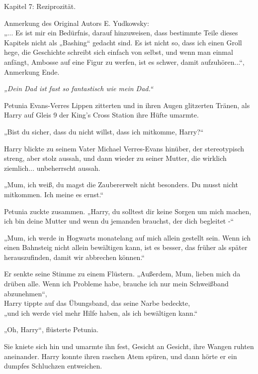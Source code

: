 

\hypertarget{reziprozituxe4t}{%

Kapitel 7: Reziprozität.

Anmerkung des Original Autors E. Yudkowsky:\\ „... Es ist mir ein Bedürfnis, darauf hinzuweisen, dass bestimmte Teile dieses Kapitels nicht als „Bashing“ gedacht sind. Es ist nicht so, dass ich einen Groll hege, die Geschichte schreibt sich einfach von selbst, und wenn man einmal anfängt, Ambosse auf eine Figur zu werfen, ist es schwer, damit aufzuhören...“, Anmerkung Ende.

\emph{„Dein Dad ist fast so fantastisch wie mein Dad.“}

Petunia Evans-Verres Lippen zitterten und in ihren Augen glitzerten Tränen, als Harry auf Gleis 9 der King's Cross Station ihre Hüfte umarmte.

„Bist du sicher, dass du nicht willst, dass ich mitkomme, Harry?“

Harry blickte zu seinem Vater Michael Verres-Evans hinüber, der stereotypisch streng, aber stolz aussah, und dann wieder zu seiner Mutter, die wirklich ziemlich... unbeherrscht aussah.

„Mum, ich weiß, du magst die Zaubererwelt nicht besonders. Du musst nicht mitkommen. Ich meine es ernst.“

Petunia zuckte zusammen. „Harry, du solltest dir keine Sorgen um mich machen, ich bin deine Mutter und wenn du jemanden brauchst, der dich begleitet -“

„Mum, ich werde in Hogwarts monatelang auf mich allein gestellt sein. Wenn ich einen Bahnsteig nicht allein bewältigen kann, ist es besser, das früher als später herauszufinden, damit wir abbrechen können.“

Er senkte seine Stimme zu einem Flüstern. „Außerdem, Mum, lieben mich da drüben alle. Wenn ich Probleme habe, brauche ich nur mein Schweißband abzunehmen“,\\ Harry tippte auf das Übungsband, das seine Narbe bedeckte,\\ „und ich werde viel mehr Hilfe haben, als ich bewältigen kann.“

„Oh, Harry“, flüsterte Petunia.

Sie kniete sich hin und umarmte ihn fest, Gesicht an Gesicht, ihre Wangen ruhten aneinander. Harry konnte ihren raschen Atem spüren, und dann hörte er ein dumpfes Schluchzen entweichen.

}
